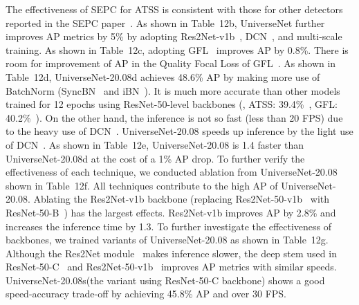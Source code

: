 \documentclass[10pt,twocolumn,letterpaper]{article}
\newcommand{\OurOrig}{UniverseNet\xspace}
\newcommand{\OurAugustD}{UniverseNet-20.08d\xspace}
\newcommand{\OurAugust}{UniverseNet-20.08\xspace}
\newcommand{\OurAugustS}{UniverseNet-20.08s\xspace}
\newcommand{\APS}{AP\xspace}
\begin{document}
The effectiveness of SEPC for ATSS is consistent with those for other detectors reported in the SEPC paper~\cite{SEPC_CVPR2020}.
As shown in Table~12b, \OurOrig further improves AP metrics by 5\%
by adopting Res2Net-v1b~\cite{Res2Net_TPAMI2020, Res2Net_PretrainedModels}, DCN~\cite{DCN_ICCV2017}, and multi-scale training.
As shown in Table~12c, adopting GFL~\cite{GFL_NeurIPS2020} improves AP by 0.8\%.
There is room for improvement of \APS in the Quality Focal Loss of GFL~\cite{GFL_NeurIPS2020}.
As shown in Table~12d,
\OurAugustD achieves 48.6\% AP by making more use of BatchNorm (SyncBN~\cite{MegDet_CVPR2018} and iBN~\cite{SEPC_CVPR2020}).
It is much more accurate than other models trained for 12 epochs using ResNet-50-level backbones (\eg, ATSS: 39.4\%~\cite{ATSS_CVPR2020, MMDetection}, GFL: 40.2\%~\cite{GFL_NeurIPS2020, MMDetection}).
On the other hand, the inference is not so fast (less than 20 FPS) due to the heavy use of DCN~\cite{DCN_ICCV2017}.
\OurAugust speeds up inference by the light use of DCN~\cite{DCN_ICCV2017, SEPC_CVPR2020}.
As shown in Table~12e,
\OurAugust is 1.4 faster than \OurAugustD at the cost of a 1\% AP drop.
To further verify the effectiveness of each technique, we conducted ablation from \OurAugust shown in Table~12f.
All techniques contribute to the high AP of \OurAugust.
Ablating the Res2Net-v1b backbone (replacing Res2Net-50-v1b~\cite{Res2Net_TPAMI2020, Res2Net_PretrainedModels} with ResNet-50-B~\cite{BagOfTricks_Classification_CVPR2019}) has the largest effects.
Res2Net-v1b improves AP by 2.8\% and increases the inference time by 1.3.
To further investigate the effectiveness of backbones, we trained variants of \OurAugust as shown in Table~12g.
Although the Res2Net module~\cite{Res2Net_TPAMI2020} makes inference slower,
the deep stem used in ResNet-50-C~\cite{BagOfTricks_Classification_CVPR2019} and Res2Net-50-v1b~\cite{Res2Net_TPAMI2020, Res2Net_PretrainedModels}
improves AP metrics with similar speeds.
\OurAugustS (the variant using ResNet-50-C backbone) shows a good speed-accuracy trade-off by achieving 45.8\% AP and over 30 FPS.
\fi
\end{document}
